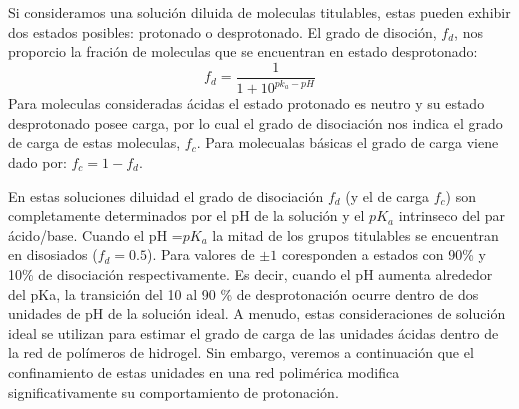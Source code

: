 Si consideramos una solución diluida de moleculas titulables, estas pueden exhibir dos estados posibles: protonado o desprotonado. El grado de disoción, $f_d$, nos proporcio la fración de moleculas que se encuentran en estado desprotonado:
\begin{equation}
    f_d = \frac{1}{1+10^{pk_a -pH}}
    \label{eq:diso}
\end{equation}
Para moleculas consideradas ácidas el estado protonado es neutro y su estado desprotonado posee carga, por lo cual el grado de disociación nos indica el grado de carga de estas moleculas, $f_c$.
Para molecualas básicas el grado de carga viene dado por: $f_c =1- f_d$.

En estas soluciones diluidad el grado de disociación $f_d$ (y el de carga $f_c$) son completamente determinados por el pH de la solución y el $pK_a$ intrinseco del par ácido/base. 
Cuando el pH =$pK_a$ la mitad de los grupos titulables se encuentran en disosiados ($f_d = 0.5$). Para valores de $\pm 1$ coresponden a estados con 90\% y 10\% de disociación respectivamente.
Es decir, cuando el pH aumenta alrededor del pKa, la transición del 10 al 90 \% de desprotonación ocurre dentro de dos unidades de pH de la solución ideal. A menudo, estas consideraciones de solución ideal se utilizan para estimar el grado de carga de las unidades ácidas dentro de la red de polímeros de hidrogel. Sin embargo, veremos a continuación que el confinamiento de estas unidades en una red polimérica modifica significativamente su comportamiento de protonación.

